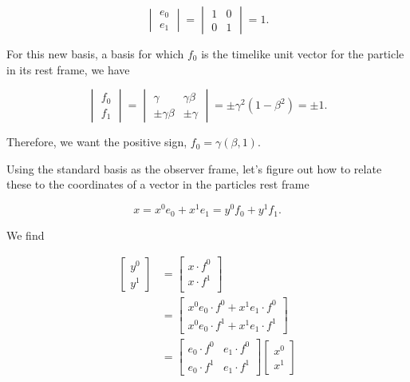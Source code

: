 \documentclass[iop,tighten]{emulateapj}
\begin{document}
\begin{equation}\label{eqn:grahamSchmidtLorentz:680}
\begin{vmatrix}
e_0 \\
e_1
\end{vmatrix} 
=
\begin{vmatrix}
1 & 0 \\
0 & 1
\end{vmatrix} 
= 1.
\end{equation}

For this new basis, a basis for which $f_0$ is the timelike unit vector for the particle in its rest frame, we have

\begin{equation}\label{eqn:grahamSchmidtLorentz:685}
\begin{vmatrix}
f_0 \\
f_1
\end{vmatrix} 
=
\begin{vmatrix}
\gamma & \gamma \beta \\
\pm \gamma \beta & \pm \gamma
\end{vmatrix} 
=
\pm \gamma^2 ( 1 - \beta^2)
= \pm 1.
\end{equation}

Therefore, we want the positive sign, $f_0 = \gamma (\beta, 1)$.

Using the standard basis as the observer frame, let's figure out how to relate these to the coordinates of a vector in the particles rest frame

\begin{equation}\label{eqn:grahamSchmidtLorentz:700}
x = x^0 e_0 + x^1 e_1 = y^0 f_0 + y^1 f_1.
\end{equation}

We find

\begin{equation}\label{eqn:grahamSchmidtLorentz:720}
\begin{aligned}
\begin{bmatrix}
y^0 \\
y^1
\end{bmatrix}
&=
\begin{bmatrix}
x \cdot f^0 \\
x \cdot f^1 \\
\end{bmatrix} \\
&=
\begin{bmatrix}
x^0 e_0 \cdot f^0 + x^1 e_1 \cdot f^0 \\
x^0 e_0 \cdot f^1 + x^1 e_1 \cdot f^1
\end{bmatrix} \\
&=
\begin{bmatrix}
e_0 \cdot f^0 & e_1 \cdot f^0 \\
e_0 \cdot f^1 & e_1 \cdot f^1
\end{bmatrix}
\begin{bmatrix}
x^0 \\
x^1
\end{bmatrix}
\end{aligned}
\end{equation}
\end{document}
